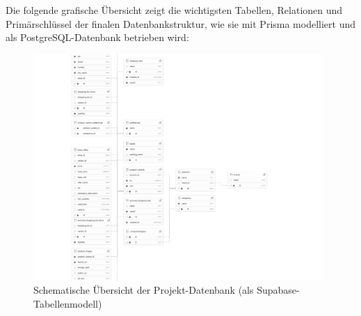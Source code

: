 \documentclass[12pt, a4paper]{report} %
\begin{document}
Die folgende grafische Übersicht zeigt die wichtigsten Tabellen, Relationen und Primärschlüssel der finalen Datenbankstruktur, wie sie mit Prisma modelliert und als PostgreSQL-Datenbank betrieben wird:

\begin{figure}[h!]
    \centering
    \includegraphics[width=0.98\textwidth]{media/supabase-schema-vgqtxqfvygduzmuwlmba.png}
    \caption{Schematische Übersicht der Projekt-Datenbank (als Supabase-Tabellenmodell)}
    \label{fig:db-schema}
\end{figure}
\end{document}
